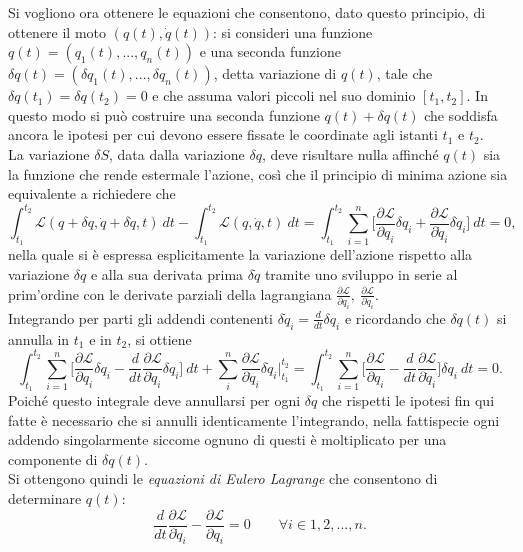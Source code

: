 Si vogliono ora ottenere le equazioni che consentono, dato questo principio, di ottenere il moto $(q(t),\dot{q}(t))$: si consideri una funzione $q(t)=(q_1(t),...,q_n(t))$ e una seconda funzione $\delta q(t)=(\delta q_1(t),...,\delta q_n(t))$, detta variazione di $q(t)$, tale che $\delta q (t_1)=\delta q(t_2)=0$ e che assuma valori piccoli nel suo dominio $[t_1,t_2]$. In questo modo si può costruire una seconda funzione $q(t)+\delta q(t)$ che soddisfa ancora le ipotesi per cui devono essere fissate le coordinate agli istanti $t_1$ e $ t_2$.\\
La variazione $\delta S$, data dalla variazione $\delta q$, deve risultare nulla affinché $q(t)$ sia la funzione che rende estermale l'azione, così che il principio di minima azione sia equivalente a richiedere che
\begin{equation}
    \int_{t_1}^{t_2} \mathcal{L}(q+\delta q,\dot{q}+\delta \dot{q},t)\ dt-\int_{t_1}^{t_2} \mathcal{L}(q,\dot{q},t)\ dt=\int_{t_1}^{t_2}\sum_{i=1}^{n}\bigg[\frac{\partial\mathcal{L} }{\partial q_i}\delta q_i+\frac{\partial\mathcal{L} }{\partial \dot{q}_i}\delta \dot{q}_i \bigg]\ dt=0,
\end{equation}
nella quale si è espressa esplicitamente la variazione dell'azione rispetto alla variazione $\delta q$ e alla sua derivata prima $\delta \dot{q}$ tramite uno sviluppo in serie al prim'ordine con le derivate parziali della lagrangiana $\frac{\partial\mathcal{L} }{\partial q_i},\ \frac{\partial\mathcal{L} }{\partial \dot{q}_i}$.\\
Integrando per parti gli addendi contenenti $\delta \dot{q}_i=\frac{d}{dt}\delta q_i$ e ricordando che $\delta q (t)$ si annulla in $t_1$ e in $t_2$, si ottiene
\begin{equation*}
    \int_{t_1}^{t_2}\sum_{i=1}^{n}\bigg[\frac{\partial\mathcal{L} }{\partial q_i}\delta q_i-\frac{d}{dt}\frac{\partial\mathcal{L} }{\partial \dot{q}_i}\delta q_i \bigg]\ dt+\sum_i^n\frac{\partial\mathcal{L} }{\partial \dot q_i}\delta \dot{q}_i\bigg|_{t_1}^{t_2}=\int_{t_1}^{t_2}\sum_{i=1}^{n}\bigg[\frac{\partial\mathcal{L} }{\partial q_i}-\frac{d}{dt}\frac{\partial\mathcal{L} }{\partial \dot{q}_i} \bigg]\delta q_i\ dt=0.
\end{equation*}
Poiché questo integrale deve annullarsi per ogni $\delta q$ che rispetti le ipotesi fin qui fatte è necessario che si annulli identicamente l'integrando, nella fattispecie ogni addendo singolarmente siccome ognuno di questi è moltiplicato per una componente di $\delta q(t)$.\\Si ottengono quindi le \emph{equazioni di Eulero Lagrange} che consentono di determinare $q(t)$:
\begin{equation}
    \label{eulero-lagrange}
    \frac{d}{dt}\frac{\partial\mathcal{L} }{\partial \dot{q}_i}-\frac{\partial\mathcal{L} }{\partial q_i}=0 \qquad \forall i\in{1,2,...,n}.
\end{equation}

